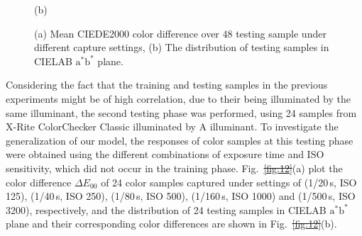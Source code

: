 \documentclass[9pt,twocolumn,twoside]{osajnl}
\providecommand{\DIFadd}[1]{{\protect\color{blue}\uwave{#1}}} %
\providecommand{\DIFdel}[1]{{\protect\color{red}\sout{#1}}}                      %
\providecommand{\DIFaddbegin}{} %
\providecommand{\DIFaddend}{} %
\providecommand{\DIFdelbegin}{} %
\providecommand{\DIFdelend}{} %
\providecommand{\DIFaddbeginFL}{} %
\providecommand{\DIFaddendFL}{} %
\providecommand{\DIFdelbeginFL}{} %
\providecommand{\DIFdelendFL}{} %
\begin{document}
\begin{figure}[tbp]
\begin{minipage}[b]{0.43\linewidth}
			(b)
		\end{minipage}
		\caption{(a) Mean CIEDE2000 color difference over 48 testing sample under different capture settings, (b) The distribution of testing samples in CIELAB $\text{a}^*\text{b}^*$ plane.}
		\DIFdelbeginFL %
\DIFdelendFL \DIFaddbeginFL \label{fig:13}
	\DIFaddendFL \end{figure}

	Considering the fact that the training and testing samples in the previous experiments might be of high correlation, due to their being illuminated by the same illuminant, the second testing phase was performed, using 24 samples from X-Rite ColorChecker Classic illuminated by A illuminant. To investigate the generalization of our model, the responses of color samples at this testing phase were obtained using the different combinations of exposure time and ISO sensitivity, which did not occur in the training phase. Fig.~\DIFdelbegin \DIFdel{\ref{fig:12}}\DIFdelend \DIFaddbegin \DIFadd{\ref{fig:14}}\DIFaddend (a) plot the color difference $\Delta{}E_{00}$ of 24 color samples captured under settings of (1/20\,s, ISO 125), (1/40\,s, ISO 250), (1/80\,s, ISO 500), (1/160\,s, ISO 1000) and (1/500\,s, ISO 3200), respectively, and the distribution of 24 testing samples in CIELAB $\text{a}^*\text{b}^*$ plane and their corresponding color differences \DIFaddbegin \DIFadd{of our model }\DIFaddend are shown in Fig.~\DIFdelbegin \DIFdel{\ref{fig:12}}\DIFdelend \DIFaddbegin \DIFadd{\ref{fig:14}}\DIFaddend (b).
\end{document}
